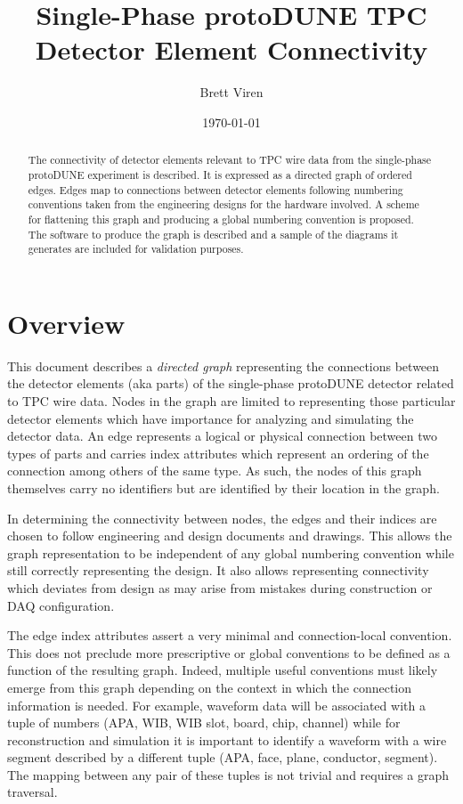 \documentclass[pdftex,12pt,letter]{article}
\author{Brett Viren}
\date{\today}
\title{Single-Phase protoDUNE TPC \\ Detector Element Connectivity}
\begin{document}
\maketitle

\begin{abstract}
  \noindent The connectivity of detector elements relevant to TPC wire
  data from the single-phase protoDUNE experiment is described.  It is
  expressed as a directed graph of ordered edges.  Edges map to
  connections between detector elements following numbering conventions
  taken from the engineering designs for the hardware involved.  A
  scheme for flattening this graph and producing a global numbering
  convention is proposed.  The software to produce the graph is
  described and a sample of the diagrams it generates are included for
  validation purposes.
\end{abstract}

\tableofcontents
\newpage
\section{Overview}

This document describes a \textit{directed graph} representing the
connections between the detector elements (aka parts) of the
single-phase protoDUNE detector related to TPC wire data.  Nodes in
the graph are limited to representing those particular detector
elements which have importance for analyzing and simulating the
detector data.  An edge represents a logical or physical connection
between two types of parts and carries index attributes which
represent an ordering of the connection among others of the same type.
As such, the nodes of this graph themselves carry no identifiers but
are identified by their location in the graph.

In determining the connectivity between nodes, the edges and their
indices are chosen to follow engineering and design documents and
drawings.  This allows the graph representation to be independent of
any global numbering convention while still correctly representing the
design.  It also allows representing connectivity which deviates from
design as may arise from mistakes during construction or DAQ
configuration.

The edge index attributes assert a very minimal and connection-local
convention.  This does not preclude more prescriptive or global
conventions to be defined as a function of the resulting graph.
Indeed, multiple useful conventions must likely emerge from this graph
depending on the context in which the connection information is
needed.  For example, waveform data will be associated with a tuple of
numbers (APA, WIB, WIB slot, board, chip, channel) while for
reconstruction and simulation it is important to identify a waveform
with a wire segment described by a different tuple (APA, face,
plane, conductor, segment).  The mapping between any pair of these
tuples is not trivial and requires a graph traversal.
\end{document}
